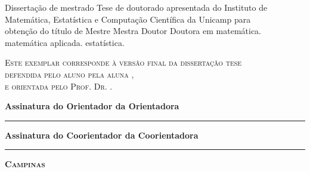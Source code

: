 \vspace{.5cm}
\begin{flushright}
    \begin{minipage}[c]{.8\textwidth}
        \begin{flushright}
            \ifx\mestrado\undefined
            Disserta\c{c}\~{a}o de mestrado
            \else
            Tese de doutorado
            \fi
            apresentada do Instituto de \\ Matem\'atica,
            Estat\'istica e Computa\c c\~ao Cient\'ifica
            da Unicamp para \\ obten\c c\~ao do t\'itulo de
            \ifx\mestrado\undefined
                \ifx\femaleAuthor\undefined
                Mestre
                \else
                Mestra
                \fi
            \else
                \ifx\femaleAuthor\undefined
                Doutor
                \else
                Doutora
                \fi
            \fi
            em
            \ifx\matematica\undefined
            \else
            matem\'{a}tica.
            \fi
            \ifx\aplicada\undefined
            \else
            matem\'{a}tica aplicada.
            \fi
            \ifx\estatistica\undefined
            \else
            estat\'{i}stica.
            \fi
        \end{flushright}
    \end{minipage}
\end{flushright}
\vspace{.5cm}
\noindent
{\footnotesize \scshape
Este exemplar corresponde \`a vers\~ao final da 
\ifx\mestrado\undefined
disserta\c{c}\~{a}o
\else
tese
\fi \\
defendida 
\ifx\femaleAuthor\undefined
pelo aluno
\else
pela aluna
\fi
\autor,\\
e orientada pelo Prof. Dr. \orientador.
}
\vspace{1cm}

\noindent
{\small \bfseries
\noindent
Assinatura
\ifx\femaleOrientador\undefined
do Orientador
\else
da Orientadora
\fi

\vspace{.7cm}
\noindent
\rule[1pt]{7cm}{.5pt}  %
}
\vspace{.5cm}


\ifx\coorientador\undefined
\else
{\small \bfseries
\noindent
Assinatura
\ifx\femaleCoorientador\undefined
do Coorientador
\else
da Coorientadora
\fi

\vspace{.7cm}
\noindent
\rule[1pt]{7cm}{.5pt}  %
}
\fi
\vfill
\begin{center}
    {\small \scshape \bfseries Campinas \\ \ano}
\end{center}
